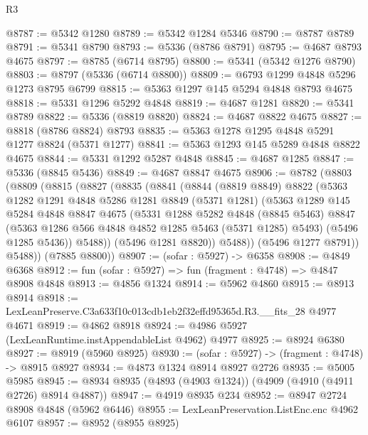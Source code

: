\begin{lexlean}{R3}
\begin{coremodule}
@8787 := @5342 @1280
@8789 := @5342 @1284 @5346
@8790 := @8787 @8789
@8791 := @5341 @8790
@8793 := @5336 (@8786 @8791)
@8795 := @4687 @8793 @4675
@8797 := @8785 (@6714 @8795)
@8800 := @5341 (@5342 @1276 @8790)
@8803 := @8797 (@5336 (@6714 @8800))
@8809 := @6793 @1299 @4848 @5296 @1273 @8795 @6799
@8815 := @5363 @1297 @145 @5294 @4848 @8793 @4675
@8818 := @5331 @1296 @5292 @4848
@8819 := @4687 @1281
@8820 := @5341 @8789
@8822 := @5336 (@8819 @8820)
@8824 := @4687 @8822 @4675
@8827 := @8818 (@8786 @8824) @8793
@8835 := @5363 @1278 @1295 @4848 @5291 @1277 @8824 (@5371 @1277)
@8841 := @5363 @1293 @145 @5289 @4848 @8822 @4675
@8844 := @5331 @1292 @5287 @4848
@8845 := @4687 @1285
@8847 := @5336 (@8845 @5436)
@8849 := @4687 @8847 @4675
@8906 := @8782
    (@8803
      (@8809
        (@8815
          (@8827
            (@8835
              (@8841
                (@8844
                  (@8819 @8849)
                  @8822
                  (@5363
                    @1282
                    @1291
                    @4848
                    @5286
                    @1281
                    @8849
                    (@5371 @1281)
                    (@5363
                      @1289
                      @145
                      @5284
                      @4848
                      @8847
                      @4675
                      (@5331
                        @1288
                        @5282
                        @4848
                        (@8845 @5463)
                        @8847
                        (@5363 @1286 @566 @4848 @4852 @1285 @5463 (@5371 @1285) @5493)
                        (@5496 @1285 @5436))
                      @5488))
                  (@5496 @1281 @8820))
                @5488))
            (@5496 @1277 @8791))
          @5488))
      (@7885 @8800))
@8907 := (sofar : @5927) -> @6358
@8908 := @4849 @6368
@8912 := fun (sofar : @5927) => fun (fragment : @4748) => @4847 @8908 @4848
@8913 := @4856 @1324
@8914 := @5962 @4860
@8915 := @8913 @8914
@8918 := LexLeanPreserve.C3a633f10c013cdb1eb2f32effd95365d.R3.__fits_28 @4977 @4671
@8919 := @4862 @8918
@8924 := @4986 @5927 (LexLeanRuntime.instAppendableList @4962) @4977
@8925 := @8924 @6380
@8927 := @8919 (@5960 @8925)
@8930 := (sofar : @5927) -> (fragment : @4748) -> @8915 @8927
@8934 := @4873 @1324 @8914 @8927 @2726
@8935 := @5005 @5985
@8945 := @8934 @8935 (@4893 (@4903 @1324)) (@4909 (@4910 (@4911 @2726) @8914 @4887))
@8947 := @4919 @8935 @234
@8952 := @8947 @2724 @8908 @4848 (@5962 @6446)
@8955 := LexLeanPreservation.ListEnc.enc @4962 @6107
@8957 := @8952 (@8955 @8925)

\end{coremodule}
\end{lexlean}
